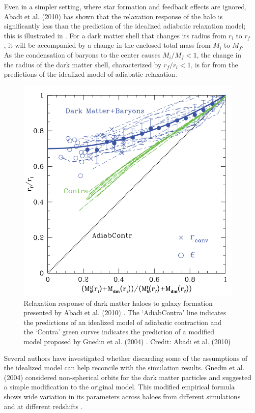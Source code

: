 Even in a simpler setting, where star formation and feedback effects are ignored, Abadi et al. (2010) \citep{2010MNRAS.407..435A} has shown that the relaxation response of the halo is significantly less than the prediction of the idealized adiabatic relaxation model; this is illustrated in . For a dark matter shell that changes its radius from $r_i$ to $r_f$, it will be accompanied by a change in the enclosed total mass from $M_i$ to $M_f$. As the condensation of baryons to the center causes $M_i/M_f < 1$, the change in the radius of the dark matter shell, characterized by $r_f/r_i < 1$, is far from the predictions of the idealized model of adiabatic relaxation.

\begin{figure}
\centering
\includegraphics[width=0.7\linewidth]{Figures/Abadi_relxation.png}
\caption{Relaxation response of dark matter haloes to galaxy formation presented by Abadi et al. (2010) \citep{2010MNRAS.407..435A}. The `AdiabContra' line indicates the predictions of an idealized model of adiabatic contraction \citep[][]{1986ApJ...301...27B} and the `Contra' green curves indicates the prediction of a modified model proposed by Gnedin et al. (2004) \citep{2004ApJ...616...16G}. Credit: Abadi et al. (2010) \citep{2010MNRAS.407..435A}}
\label{fig:illustrate_abadi}
\end{figure}

Several authors have investigated whether discarding some of the assumptions of the idealized model \citep[][]{1986ApJ...301...27B} can help reconcile with the simulation results. Gnedin et al. (2004) \citep{2004ApJ...616...16G} considered non-spherical orbits for the dark matter particles and suggested a simple modification to the original model. This modified empirical formula shows wide variation in its parameters across haloes from different simulations and at different redshifts \citep[][]{2006PhRvD..74l3522G,2010MNRAS.405.2161D}.

